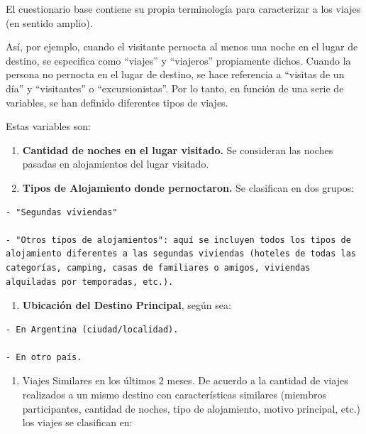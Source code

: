 \documentclass[
  openany]{book}
\providecommand{\tightlist}{%
  \setlength{\itemsep}{0pt}\setlength{\parskip}{0pt}}
\begin{document}
El cuestionario base contiene su propia terminología para caracterizar a los viajes (en sentido amplio).

Así, por ejemplo, cuando el visitante pernocta al menos una noche en el lugar de destino, se especifica como ``viajes'' y ``viajeros'' propiamente dichos. Cuando la persona no pernocta en el lugar de destino, se hace referencia a ``visitas de un día'' y ``visitantes'' o ``excursionistas''. Por lo tanto, en función de una serie de variables, se han definido diferentes tipos de viajes.

Estas variables son:

\begin{enumerate}
\def\labelenumi{\arabic{enumi}.}
\item
  \textbf{Cantidad de noches en el lugar visitado.} Se consideran las noches pasadas en alojamientos del lugar visitado.
\item
  \textbf{Tipos de Alojamiento donde pernoctaron.} Se clasifican en dos grupos:
\end{enumerate}

\begin{verbatim}
- "Segundas viviendas" 

- "Otros tipos de alojamientos": aquí se incluyen todos los tipos de alojamiento diferentes a las segundas viviendas (hoteles de todas las categorías, camping, casas de familiares o amigos, viviendas alquiladas por temporadas, etc.).
\end{verbatim}

\begin{enumerate}
\def\labelenumi{\arabic{enumi}.}
\tightlist
\item
  \textbf{Ubicación del Destino Principal}, según sea:
\end{enumerate}

\begin{verbatim}
- En Argentina (ciudad/localidad).

- En otro país.
\end{verbatim}

\begin{enumerate}
\def\labelenumi{\arabic{enumi}.}
\tightlist
\item
  Viajes Similares en los últimos 2 meses. De acuerdo a la cantidad de viajes realizados a un mismo destino con características similares (miembros participantes, cantidad de noches, tipo de alojamiento, motivo principal, etc.) los viajes se clasifican en:
\end{enumerate}
\end{document}
